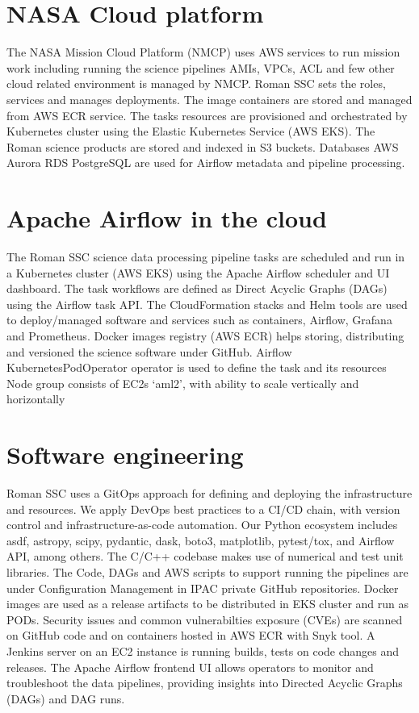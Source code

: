 \documentclass[11pt,twoside]{article}
\begin{document}
\section{NASA Cloud platform}

The NASA Mission Cloud Platform (NMCP) uses AWS services to run mission work including running the science pipelines
AMIs, VPCs, ACL and few other cloud related environment is managed by NMCP. Roman SSC sets the roles, services and manages deployments.
The image containers are stored and managed from AWS ECR service.
The tasks resources are provisioned and orchestrated by Kubernetes cluster using the Elastic Kubernetes Service (AWS EKS).
The Roman science products are stored and indexed in S3 buckets.
Databases AWS Aurora RDS PostgreSQL are used for Airflow metadata and pipeline processing.

\section{Apache Airflow in the cloud}

The Roman SSC science data processing pipeline tasks are scheduled and run in a Kubernetes cluster (AWS EKS) using the Apache Airflow scheduler and UI dashboard. The task workflows are defined as Direct Acyclic Graphs (DAGs) using the Airflow task API.
The CloudFormation stacks and Helm tools are used to deploy/managed software and services such as containers, Airflow, Grafana and Prometheus.
Docker images registry (AWS ECR) helps storing, distributing and versioned the science software under GitHub.
Airflow KubernetesPodOperator operator is used to define the task and its resources
Node group consists of EC2s ‘aml2’, with ability to scale vertically and horizontally

\section{Software engineering}

Roman SSC uses a GitOps approach for defining and deploying the infrastructure and resources. We apply DevOps best practices to a CI/CD chain, with version control and infrastructure-as-code automation. Our Python ecosystem includes asdf, astropy, scipy, pydantic, dask, boto3, matplotlib, pytest/tox, and Airflow API, among others. The C/C++ codebase makes use of numerical and test unit libraries.
The Code, DAGs and AWS scripts to support running the pipelines are under Configuration Management in IPAC private GitHub repositories.
Docker images are used as a release artifacts to be distributed in EKS cluster and run as PODs.
Security issues and common vulnerabilties exposure (CVEs) are scanned on GitHub code and on containers hosted in AWS ECR with Snyk tool.
A Jenkins server on an EC2 instance is running builds, tests on code changes and releases.
The Apache Airflow frontend UI allows operators to monitor and troubleshoot the data pipelines, providing insights into Directed Acyclic Graphs (DAGs) and DAG runs.
\end{document}
